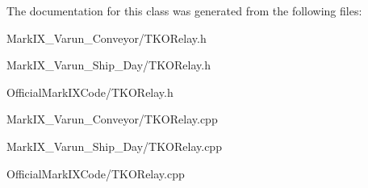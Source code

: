 The documentation for this class was generated from the following files\-:\begin{DoxyCompactItemize}
\item 
Mark\-I\-X\-\_\-\-Varun\-\_\-\-Conveyor/T\-K\-O\-Relay.\-h\item 
Mark\-I\-X\-\_\-\-Varun\-\_\-\-Ship\-\_\-\-Day/T\-K\-O\-Relay.\-h\item 
Official\-Mark\-I\-X\-Code/T\-K\-O\-Relay.\-h\item 
Mark\-I\-X\-\_\-\-Varun\-\_\-\-Conveyor/T\-K\-O\-Relay.\-cpp\item 
Mark\-I\-X\-\_\-\-Varun\-\_\-\-Ship\-\_\-\-Day/T\-K\-O\-Relay.\-cpp\item 
Official\-Mark\-I\-X\-Code/T\-K\-O\-Relay.\-cpp\end{DoxyCompactItemize}
